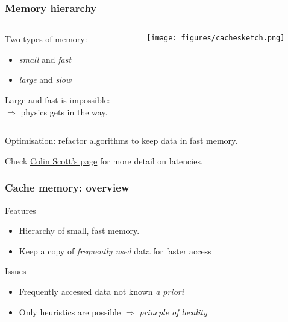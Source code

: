 \documentclass[dvipsnames,presentation,aspectratio=169,14pt]{beamer}
\begin{document}
\begin{frame}
  \frametitle{Memory hierarchy}
  \vskip -15pt

  \begin{columns}
    \begin{column}{0.45\textwidth}
      Two types of memory:\\[7pt]
      \begin{itemize}[itemsep=7pt]
      \item \emph{small} and \emph{fast}
      \item \emph{large} and \emph{slow}
      \end{itemize}
      \vskip 7pt

      Large and fast is impossible:\\[7pt]
      \hspace{11pt} $\Rightarrow$ physics gets in the way.
    \end{column}
    \begin{column}{0.45\textwidth}
      \begin{center}
        \texttt{[image: figures/cachesketch.png]}
      \end{center}
    \end{column}
  \end{columns}
  \vspace{\baselineskip}
  Optimisation: refactor algorithms to keep data in fast
  memory.

  {\footnotesize
    Check
    \href{https://colin-scott.github.io/personal_website/research/interactive_latency.html}{Colin
    Scott's page}
    for more detail on latencies.}
\end{frame}

\begin{frame}
  \frametitle{Cache memory: overview}

  \begin{exampleblock}{Features}
    \begin{itemize}[itemsep=6pt]
    \item Hierarchy of small, fast memory.
    \item Keep a copy of \emph{frequently used} data for faster access
    \end{itemize}
  \end{exampleblock}

  \pause

  \begin{challenge}{Issues}
    \begin{itemize}[itemsep=6pt]
    \item Frequently accessed data not known \emph{a priori}
    \item Only heuristics are possible $\Rightarrow$ \emph{princple of locality}
    \end{itemize}
  \end{challenge}

\end{frame}
\end{document}
